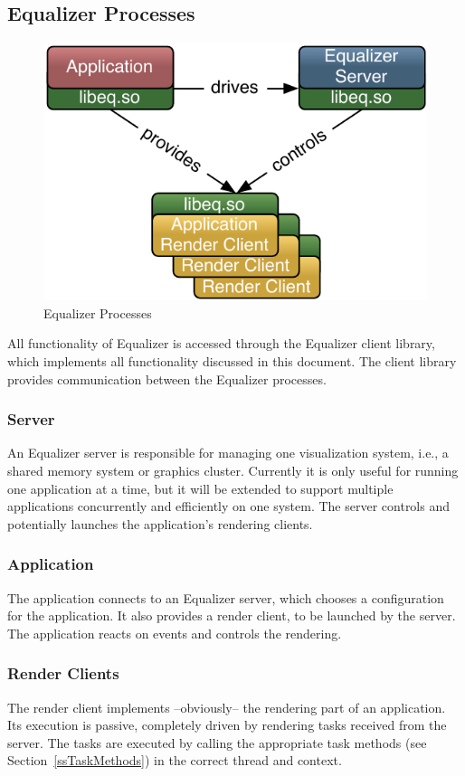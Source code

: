 \documentclass[10pt,a4]{scrartcl}
\newcommand{\sref}[1]{Section~\ref{#1}}
\begin{document}
\subsection{Equalizer Processes}

\begin{figure}
  \includegraphics[width=.4\textwidth]{images/processes.pdf}
  {\caption{\small\label{fProcesses}Equalizer Processes}}
\end{figure}
All functionality of Equalizer is accessed through the Equalizer client
library, which implements all functionality discussed in this
document. The client library provides communication between the Equalizer
processes.

\subsubsection{Server}

An Equalizer server is responsible for managing one visualization
system, i.e., a shared memory system or graphics cluster. Currently it
is only useful for running one application at a time, but it will be
extended to support multiple applications concurrently and efficiently
on one system. The server controls and potentially launches the
application's rendering clients.

\subsubsection{Application}

The application connects to an Equalizer server, which chooses a
configuration for the application. It also provides a render client, to
be launched by the server. The application reacts on events and controls
the rendering.

\subsubsection{Render Clients}

The render client implements --obviously-- the rendering part of an
application. Its execution is passive, completely driven by rendering
tasks received from the server. The tasks are executed by calling the
appropriate task methods (see \sref{ssTaskMethods}) in the correct
thread and context.
\end{document}
